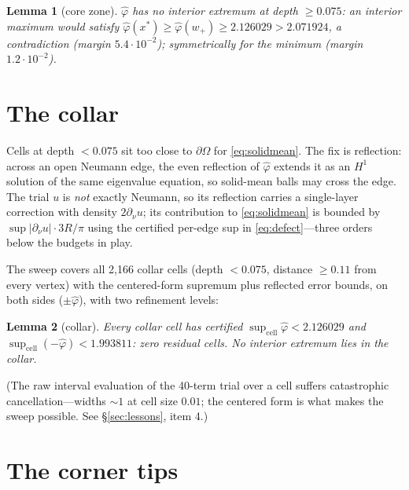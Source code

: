\documentclass[11pt]{article}
\newtheorem{lemma}{Lemma}
\newcommand{\dnu}{\partial_\nu}
\newcommand{\phih}{\hat\varphi}
\begin{document}
\begin{lemma}[core zone]\label{lem:core}
$\phih$ has no interior extremum at depth $\ge 0.075$: an interior
maximum would satisfy
$\phih(x^*)\ge\phih(w_+)\ge 2.126029>2.071924$, a contradiction
(margin $5.4\cdot10^{-2}$); symmetrically for the minimum
(margin $1.2\cdot10^{-2}$).
\end{lemma}

\section{The collar}\label{sec:collar}

Cells at depth $<0.075$ sit too close to $\partial\Omega$ for
\eqref{eq:solidmean}. The fix is reflection: across an open Neumann
edge, the even reflection of $\phih$ extends it as an $H^1$ solution of
the same eigenvalue equation, so solid-mean balls may cross the edge.
The trial $u$ is \emph{not} exactly Neumann, so its reflection carries a
single-layer correction with density $2\dnu u$; its contribution to
\eqref{eq:solidmean} is bounded by
$\sup|\dnu u|\cdot 3R/\pi$ using the certified per-edge sup in
\eqref{eq:defect}---three orders below the budgets in play.

The sweep covers all 2{,}166 collar cells (depth $<0.075$, distance
$\ge0.11$ from every vertex) with the centered-form supremum plus
reflected error bounds, on both sides ($\pm\phih$), with two refinement
levels:

\begin{lemma}[collar]\label{lem:collar}
Every collar cell has certified
$\sup_{\mathrm{cell}}\phih < 2.126029$ and
$\sup_{\mathrm{cell}}(-\phih) < 1.993811$: \emph{zero residual cells}.
No interior extremum lies in the collar.
\end{lemma}

(The raw interval evaluation of the 40-term trial over a cell suffers
catastrophic cancellation---widths ${\sim}1$ at cell size $0.01$; the
centered form is what makes the sweep possible. See
\S\ref{sec:lessons}, item 4.)

\section{The corner tips}\label{sec:tips}
\end{document}
